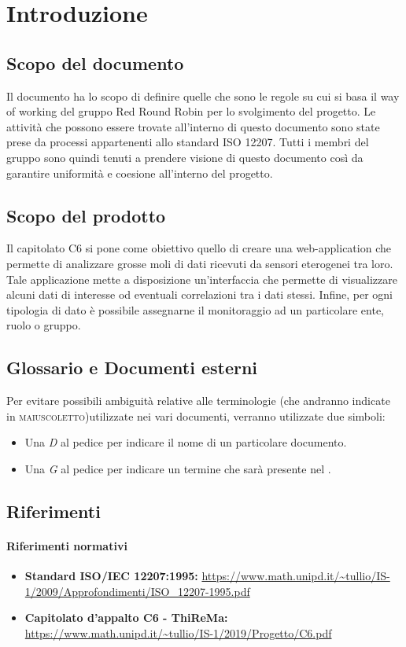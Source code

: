 \section{Introduzione}
	\subsection{Scopo del documento}
		Il documento ha lo scopo di definire quelle che sono le regole su cui si basa il way of working del gruppo Red Round Robin per lo svolgimento del progetto. Le attività che possono essere trovate all'interno di questo documento sono state prese da processi appartenenti allo standard ISO 12207. Tutti i membri del gruppo sono quindi tenuti a prendere visione di questo documento così da garantire uniformità e coesione all'interno del progetto.   
	\subsection{Scopo del prodotto}
		Il capitolato C6 si pone come obiettivo quello di creare una web-application che permette di analizzare grosse moli di dati ricevuti da sensori eterogenei tra loro. Tale applicazione mette a disposizione un'interfaccia che permette di visualizzare alcuni dati di interesse od eventuali correlazioni tra i dati stessi. Infine, per ogni tipologia di dato è possibile assegnarne il monitoraggio ad un particolare ente, ruolo o gruppo. 
	\subsection{Glossario e Documenti esterni}
		Per evitare possibili ambiguità relative alle terminologie (che andranno indicate in \textsc{maiuscoletto})utilizzate nei vari documenti, verranno utilizzate due simboli:
		\begin{itemize}
			\item Una \textit{D} al pedice per indicare il nome di un particolare documento.
			\item Una \textit{G} al pedice per indicare un termine che sarà 
			presente nel .
		\end{itemize}
	\subsection{Riferimenti}

		\paragraph{Riferimenti normativi}
			\begin{itemize}
				\item \textbf{Standard ISO/IEC 12207:1995: } 
				\url{https://www.math.unipd.it/~tullio/IS-1/2009/Approfondimenti/ISO_12207-1995.pdf}
				\item \textbf{Capitolato d'appalto C6 - ThiReMa: } 
				\url{https://www.math.unipd.it/~tullio/IS-1/2019/Progetto/C6.pdf}
			\end{itemize}	
